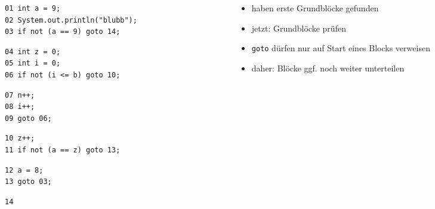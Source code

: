 \documentclass[18pt]{beamer}
\begin{document}
	\begin{frame}[fragile]
\small 
\begin{columns}
	\begin{column}{0.5\textwidth}
		\footnotesize
\begin{verbatim}
01 int a = 9;
02 System.out.println("blubb");
03 if not (a == 9) goto 14;
\end{verbatim}
\begin{verbatim}
04 int z = 0;
05 int i = 0;
06 if not (i <= b) goto 10;
\end{verbatim}
\begin{verbatim}
07 n++;
08 i++;
09 goto 06;
\end{verbatim}
\begin{verbatim}
10 z++;
11 if not (a == z) goto 13;
\end{verbatim}
\begin{verbatim}
12 a = 8;
13 goto 03;
\end{verbatim}
\begin{verbatim}
14
\end{verbatim}
	\end{column}%
	\begin{column}{0.5\textwidth}
		\begin{itemize}
			\item haben erste Grundblöcke gefunden
			\pause
			\item jetzt: Grundblöcke prüfen
			\item \texttt{goto} dürfen nur auf Start eines Blocks verweisen
			\item daher: Blöcke ggf. noch weiter unterteilen
		\end{itemize}
	\end{column}
\end{columns}	
	\end{frame}
\end{document}
